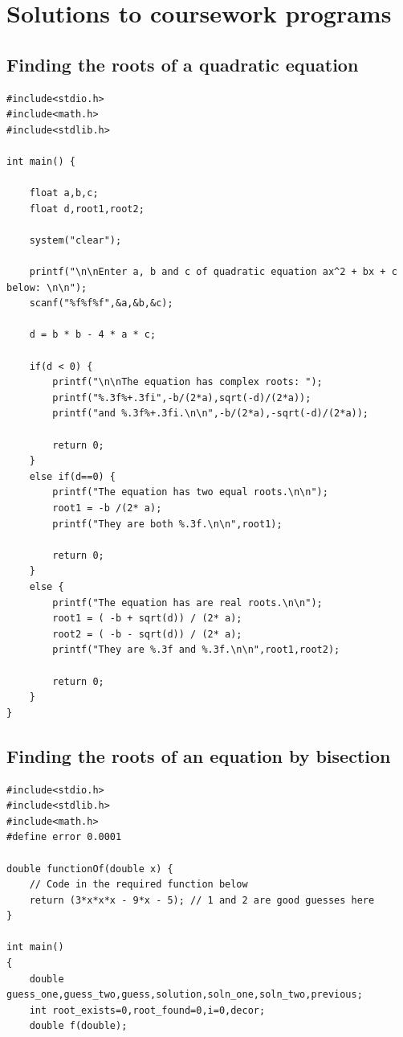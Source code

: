 \documentclass[11pt,oneside]{article}
\newcommand{\stoptocentries}{\renewcommand{\addcontentsline}[3]{}}
\begin{document}
{{{{{{{{{{{{\clearpage
\section{Solutions to coursework programs}\label{prg:exam-solutions}
\stoptocentries
\subsection{Finding the roots of a quadratic equation}
\begin{lstlisting}[firstnumber=1]
#include<stdio.h>
#include<math.h>
#include<stdlib.h>

int main() {
    
    float a,b,c;
    float d,root1,root2;
    
    system("clear");
    
    printf("\n\nEnter a, b and c of quadratic equation ax^2 + bx + c below: \n\n");
    scanf("%f%f%f",&a,&b,&c);
    
    d = b * b - 4 * a * c;
    
    if(d < 0) {
        printf("\n\nThe equation has complex roots: ");
        printf("%.3f%+.3fi",-b/(2*a),sqrt(-d)/(2*a));
        printf("and %.3f%+.3fi.\n\n",-b/(2*a),-sqrt(-d)/(2*a));
        
        return 0;
    } 
    else if(d==0) {
        printf("The equation has two equal roots.\n\n");
        root1 = -b /(2* a);
        printf("They are both %.3f.\n\n",root1);
        
        return 0;
    } 
    else {
        printf("The equation has are real roots.\n\n");
        root1 = ( -b + sqrt(d)) / (2* a);
        root2 = ( -b - sqrt(d)) / (2* a);
        printf("They are %.3f and %.3f.\n\n",root1,root2);
        
        return 0;
    }
}
\end{lstlisting}

\clearpage
\stoptocentries
\subsection{Finding the roots of an equation by bisection}
\begin{lstlisting}[firstnumber=1]
#include<stdio.h>
#include<stdlib.h>
#include<math.h>
#define error 0.0001

double functionOf(double x) {
    // Code in the required function below
    return (3*x*x*x - 9*x - 5); // 1 and 2 are good guesses here
}

int main()
{
    double guess_one,guess_two,guess,solution,soln_one,soln_two,previous;
    int root_exists=0,root_found=0,i=0,decor;
    double f(double);
    

\end{lstlisting}}}}}}}}}}}}}
\end{document}
